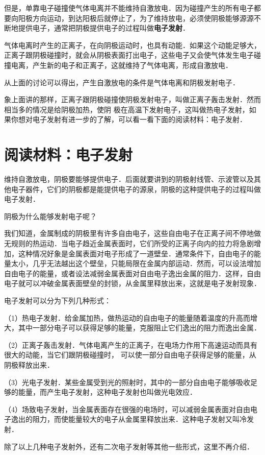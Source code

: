 但是，单靠电子碰撞使气体电离并不能维持自激放电．因为碰撞产生的所有电子都要向阳极方向运动，到达阳极后就停止了，为了维持放电，必须使阴极能够源源不断地提供电子，通常把阴极提供电子的过程叫做\textbf{电子发射}．

气体电离时产生的正离子，在向阴极运动时，也具有动能．如果这个动能足够大，正离子跟阴极碰撞时，就会从阴极表面打出电子，这些电子又会使气体发生电子碰撞电离，产生新的电子和正离子，这就维持了气体电离，形成自激放电．

从上面的讨论可以得出，产生自激放电的条件是气体电离和阴极发射电子．

象上面讲的那样，正离子跟阴极碰撞使阴极发射电子，叫做正离子轰击发射．然而相当多的情况是给阴极加热，使阴
极在高温下发射电子，这叫做热电子发射，如果你想对电子发射有进一步的了解，可以看一看下面的阅读材料：电子发射．


\section*{阅读材料：电子发射}
维持自激放电，阴极要能够提供电子．后面就要讲到的阴极射线管、示波管以及其他电子器件，它们的阴极都是能提供电子的源泉，阴极的这种提供电子的过程叫做电子发射．

阴极为什么能够发射电子呢？

我们知道，金属制成的阴极里有许多自由电子，这些自由电子在正离子间不停地做无规则的热运动．当电子趋近金属表面时，它们所受的正离子向内的拉力将急剧增加，这种情况好象是金属表面对电子形成了一道壁垒．通常条件下，自由电子的能量太小，几乎无法越出这个壁垒，只能局限在金属内部运动．然而，可以设法增加自由电子的能量，或者设法减弱金属表面对自由电子逸出金属的阻力．这样，自由电子就可以冲破金属表面壁垒的封锁，从金属里释放出来，这就是电子发射现象．

电子发射可以分为下列几种形式：

（1）热电子发射．给金属加热，做热运动的自由电子的能量随着温度的升高而增大，其中一部分电子可以获得足够的能量，克服阻止它们逸出的阻力而逸出金属．

（2）正离子轰击发射．气体电离产生的正离子，在电场力作用下高速运动而具有很大的动能，当它们跟阴极碰撞时，
可以使一部分自由电子获得足够的能量，从阴极释放出来．

（3）光电子发射．某些金属受到光的照射时，其中的一部分自由电子能够吸收足够的能量，而产生电子发射，这种电子发射也叫做光电效应．

（4）场致电子发射，当金属表面存在很强的电场时，可以减弱金属表面对自由电子逸出的阻力，而使能量较大的电子从金属里释放出来．这种电子发射又叫冷发射．

除了以上几种电子发射外，还有二次电子发射等其他一些形式，这里不再介绍．

